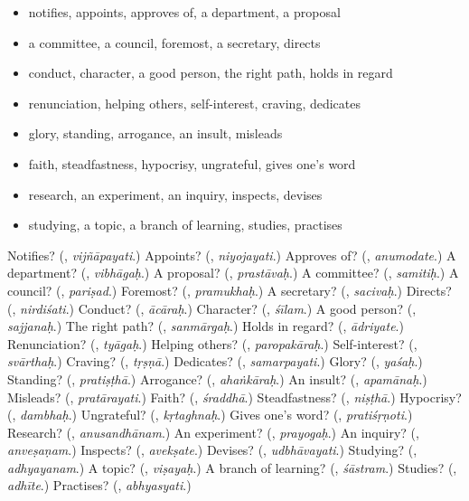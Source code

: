 \begin{itemize}
\raggedright
  \item notifies, appoints, approves of, a department, a proposal
  \item a committee, a council, foremost, a secretary, directs
  \item conduct, character, a good person, the right path, holds in regard
  \item renunciation, helping others, self-interest, craving, dedicates
  \item glory, standing, arrogance, an insult, misleads
  \item faith, steadfastness, hypocrisy, ungrateful, gives one's word
  \item research, an experiment, an inquiry, inspects, devises
  \item studying, a topic, a branch of learning, studies, practises
\end{itemize}

\begin{tcolorbox}[breakable,colback=teal!4,colframe=teal!35!black,title={Before you move on}]
Notifies? (\textbf{}, \emph{vijñāpayati}.) Appoints? (\textbf{}, \emph{niyojayati}.) Approves of? (\textbf{}, \emph{anumodate}.) A department? (\textbf{}, \emph{vibhāgaḥ}.) A proposal? (\textbf{}, \emph{prastāvaḥ}.) A committee? (\textbf{}, \emph{samitiḥ}.) A council? (\textbf{}, \emph{pariṣad}.) Foremost? (\textbf{}, \emph{pramukhaḥ}.) A secretary? (\textbf{}, \emph{sacivaḥ}.) Directs? (\textbf{}, \emph{nirdiśati}.) Conduct? (\textbf{}, \emph{ācāraḥ}.) Character? (\textbf{}, \emph{śīlam}.) A good person? (\textbf{}, \emph{sajjanaḥ}.) The right path? (\textbf{}, \emph{sanmārgaḥ}.) Holds in regard? (\textbf{}, \emph{ādriyate}.) Renunciation? (\textbf{}, \emph{tyāgaḥ}.) Helping others? (\textbf{}, \emph{paropakāraḥ}.) Self-interest? (\textbf{}, \emph{svārthaḥ}.) Craving? (\textbf{}, \emph{tṛṣṇā}.) Dedicates? (\textbf{}, \emph{samarpayati}.) Glory? (\textbf{}, \emph{yaśaḥ}.) Standing? (\textbf{}, \emph{pratiṣṭhā}.) Arrogance? (\textbf{}, \emph{ahaṅkāraḥ}.) An insult? (\textbf{}, \emph{apamānaḥ}.) Misleads? (\textbf{}, \emph{pratārayati}.) Faith? (\textbf{}, \emph{śraddhā}.) Steadfastness? (\textbf{}, \emph{niṣṭhā}.) Hypocrisy? (\textbf{}, \emph{dambhaḥ}.) Ungrateful? (\textbf{}, \emph{kṛtaghnaḥ}.) Gives one's word? (\textbf{}, \emph{pratiśṛṇoti}.) Research? (\textbf{}, \emph{anusandhānam}.) An experiment? (\textbf{}, \emph{prayogaḥ}.) An inquiry? (\textbf{}, \emph{anveṣaṇam}.) Inspects? (\textbf{}, \emph{avekṣate}.) Devises? (\textbf{}, \emph{udbhāvayati}.) Studying? (\textbf{}, \emph{adhyayanam}.) A topic? (\textbf{}, \emph{viṣayaḥ}.) A branch of learning? (\textbf{}, \emph{śāstram}.) Studies? (\textbf{}, \emph{adhīte}.) Practises? (\textbf{}, \emph{abhyasyati}.)
\end{tcolorbox}
